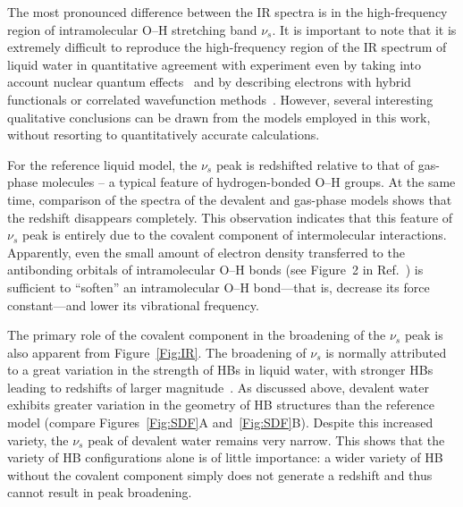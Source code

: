 \documentclass[journal=jacsat,manuscript=article]{achemso}
\begin{document}
The most pronounced difference between the IR spectra is in the high-frequency region of intramolecular O--H stretching band $\nu_s$. 
%
It is important to note that it is extremely difficult to reproduce the high-frequency region of the IR spectrum of liquid water in quantitative agreement with experiment even by taking into account nuclear quantum effects~\cite{marsalek2017quantum} and by describing electrons with hybrid functionals or correlated wavefunction methods~\cite{medders2015infrared}. 
However, several interesting qualitative conclusions can be drawn from the models employed in this work, without resorting to quantitatively accurate calculations. 

For the reference liquid model, the $\nu_s$ peak is redshifted relative to that of gas-phase molecules -- a typical feature of hydrogen-bonded O--H groups.
At the same time, comparison of the spectra of the devalent and gas-phase models shows that the redshift disappears completely. 
This observation indicates that this feature of $\nu_s$ peak is entirely due to the covalent component of intermolecular interactions. 
Apparently, even the small amount of electron density transferred to the antibonding orbitals of intramolecular O--H bonds (see Figure~2 in Ref.~) is sufficient to ``soften'' an intramolecular O--H bond---that is, decrease its force constant---and lower its vibrational frequency. 

The primary role of the covalent component in the broadening of the $\nu_s$ peak is also apparent from Figure~\ref{Fig:IR}. 
The broadening of $\nu_s$ is normally attributed to a great variation in the strength of HBs in liquid water, with stronger HBs leading to redshifts of larger magnitude~\cite{joseph2007red}. 
As discussed above, devalent water exhibits greater variation in the geometry of HB structures than the reference model (compare Figures~\ref{Fig:SDF}A and~\ref{Fig:SDF}B). 
Despite this increased variety, the $\nu_s$ peak of devalent water remains very narrow. This shows that the variety of HB configurations alone is of little importance: a wider variety of HB without the covalent component simply does not generate a redshift and thus cannot result in peak broadening. 
\end{document}
